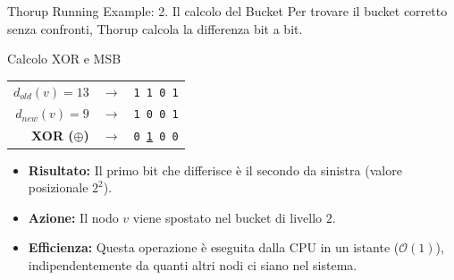 \documentclass[aspectratio=169]{beamer}
\begin{document}
\begin{frame}{Thorup Running Example: 2. Il calcolo del Bucket}
    Per trovare il bucket corretto senza confronti, Thorup calcola la differenza bit a bit.
    \vspace{0.3cm}
    \begin{exampleblock}{Calcolo XOR e MSB}
        \centering
        \begin{tabular}{rcc}
            $d_{old}(v) = 13$ & $\rightarrow$ & \texttt{1 1 0 1} \\
            $d_{new}(v) = 9$  & $\rightarrow$ & \texttt{1 0 0 1} \\ \hline
            \textbf{XOR ($\oplus$)} & $\rightarrow$ & \texttt{0 \underline{1} 0 0} \\
        \end{tabular}
    \end{exampleblock}
    \vspace{0.3cm}
    \begin{itemize}
        \item \textbf{Risultato:} Il primo bit che differisce è il secondo da sinistra (valore posizionale $2^2$).
        \item \textbf{Azione:} Il nodo $v$ viene spostato nel bucket di livello $2$.
        \item \textbf{Efficienza:} Questa operazione è eseguita dalla CPU in un istante ($\mathcal{O}(1)$), indipendentemente da quanti altri nodi ci siano nel sistema.
    \end{itemize}
\end{frame}
\end{document}
